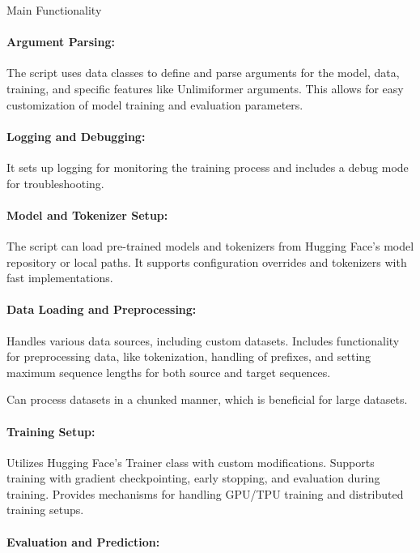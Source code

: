 \documentclass[12pt]{article}
\begin{document}
Main Functionality

\paragraph{Argument Parsing:}
The script uses data classes to define and parse arguments for
the model, data, training, and specific features like Unlimiformer arguments.
This allows for easy customization of model training and evaluation parameters.

\paragraph{Logging and Debugging:}
It sets up logging for monitoring the training process and includes a debug mode
for troubleshooting.

\paragraph{Model and Tokenizer Setup:}
The script can load pre-trained models and tokenizers from Hugging Face's model
repository or local paths. It supports configuration overrides and tokenizers
with fast implementations.

\paragraph{Data Loading and Preprocessing:}

Handles various data sources, including custom datasets. Includes functionality
for preprocessing data, like tokenization, handling of prefixes, and setting
maximum sequence lengths for both source and target sequences.

Can process datasets in a chunked manner, which is beneficial for large datasets.

\paragraph{Training Setup:}

Utilizes Hugging Face's Trainer class with custom modifications. Supports
training with gradient checkpointing, early stopping, and evaluation during
training. Provides mechanisms for handling GPU/TPU training and distributed
training setups. 

\paragraph{Evaluation and Prediction:}
\end{document}
